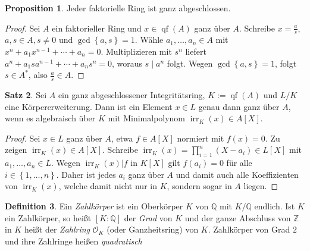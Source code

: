 \documentclass[
twoside=semi,
fontsize=12,
DIV=12, 
cleardoublepage=current,
leqno,
headings=optiontoheadandtoc, 
toc=idx
]{scrbook}
\newcommand{\Z}{\mathbb{Z}}
\newcommand{\Q}{\mathbb{Q}}
\newcommand{\set}[1]{\left\{ #1 \right\}}
\DeclareMathOperator{\qf}{qf}
\DeclareMathOperator{\irr}{irr}
\theoremstyle{definition}
\newtheorem{definition}{Definition}[section]
\newtheorem{satz}[definition]{Satz}
\newtheorem{proposition}[definition]{Proposition}
\begin{document}
 	\begin{proposition}\label{2.1.13}\hfill\newline
 		Jeder faktorielle Ring ist ganz abgeschlossen.
 		
 		\begin{proof}
 			Sei $A$ ein faktorieller Ring und $x \in \qf(A)$ ganz \"uber $A$. Schreibe $\displaystyle x = \frac{a}{s}$, \linebreak $a, s \in A, s \neq 0$ und $\gcd \set{a,s} = 1$. W\"ahle $a_1,\dots, a_n \in A$ mit $x^n + a_1x^{n-1}+\cdots + a_n = 0$. Multiplizieren mit $s^n$ liefert $a^n + a_1sa^{n-1}+\cdots + a_ns^n = 0$, woraus $s \mid a^n$ folgt. Wegen $\gcd\set{a,s} = 1$, folgt $s \in A^*$, also $\displaystyle\frac{a}{s} \in A$.
 		\end{proof}
 	\end{proposition}
 
 	\begin{satz}\label{2.1.14}\hfill\newline
 		Sei $A$ ein ganz abgeschlossener Integrit\"atsring, $K:= \qf(A)$ und $L/K$ eine K\"orpererweiterung. Dann ist ein Element $x\in L$ genau dann ganz \"uber $A$, wenn es algebraisch \"uber $K$ mit Minimalpolynom $\irr_K(x) \in A[X]$.
 		
 		\begin{proof}
 			Sei $x\in L$ ganz \"uber $A$, etwa $f\in A[X]$ normiert mit $f(x) = 0$. Zu zeigen $\irr_K(x) \in A[X]$.
 			Schreibe $\irr_K(x) = \prod_{i=1}^n (X-a_i) \in \overline{L}[X]$ mit $a_1,\dots,a_n \in \overline{L}$. Wegen $\irr_K(x)|f$ in $K[X]$ gilt $f(a_i) = 0$ f\"ur alle $i\in\set{1,\dots,n}$. Daher ist jedes $a_i$ ganz \"uber $A$ und damit auch alle Koeffizienten von $\irr_K(x)$, welche damit nicht nur in $K$, sondern sogar in $A$ liegen.
 		\end{proof}
 	\end{satz}
 
 	\begin{definition}\label{2.1.15}\hfill\newline
 		Ein \emph{Zahlk\"orper} ist ein Oberk\"orper $K$ von $\Q$ mit $K/\Q$ endlich. Ist $K$ ein Zahlk\"orper, so hei\ss t $[K:\Q]$ der \emph{Grad} von $K$ und der ganze Abschluss von $\Z$ in $K$ hei\ss t der \emph{Zahlring} $\mathcal{O}_K$ (oder Ganzheitsring) von $K$. Zahlk\"orper von Grad $2$ und ihre Zahlringe hei\ss en \emph{quadratisch} 
 	\end{definition}
 
\end{document}
